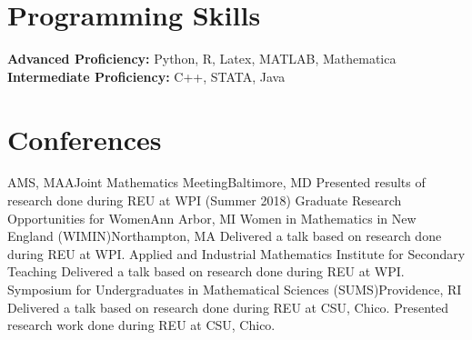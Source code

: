 \documentclass[10pt,a4paper,roman]{moderncv}        %
\begin{document}
\section{Programming Skills}
\textbf{Advanced Proficiency: } Python, R, Latex, MATLAB, Mathematica\\
\textbf{Intermediate Proficiency: } C++, STATA, Java


\section{Conferences}
{AMS, MAA}{Joint Mathematics Meeting}{Baltimore, MD}
{}{Presented results of research done during REU at WPI (Summer 2018)}
{Graduate Research Opportunities for Women}{Ann Arbor, MI}{}{}
{Women in Mathematics in New England (WIMIN)}{Northampton, MA}
{}{Delivered a talk based on research done during REU at WPI.}
{Applied and Industrial Mathematics Institute for Secondary Teaching}
{Delivered a talk based on research done during REU at WPI.}
{Symposium for Undergraduates in Mathematical Sciences (SUMS)}{Providence, RI}
{}{Delivered a talk based on research done during REU at CSU, Chico.}
{}{Presented research work done during REU at CSU, Chico.}
\end{document}
